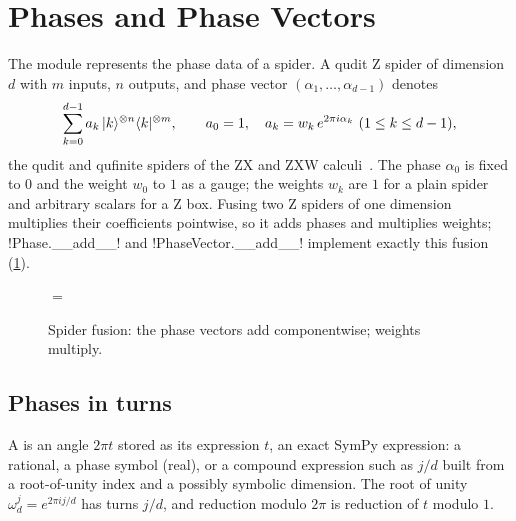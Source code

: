 \section{Phases and Phase Vectors}\label{sec:algebra-phase}

The module  represents the phase data of a spider. A qudit Z spider of dimension $d$ with $m$ inputs, $n$ outputs, and phase vector $(\alpha_1,\ldots,\alpha_{d-1})$ denotes
\begin{equation}\label{eq:algebra-zspider}
\sum_{k=0}^{d-1} a_k\,\lvert k \rangle^{\otimes n}\langle k \rvert^{\otimes m},\qquad a_0=1,\quad a_k=w_k\,e^{2\pi i\alpha_k}\ (1\le k\le d-1),
\end{equation}
the qudit and qufinite spiders of the ZX and ZXW calculi~\cite{coecke2011interacting,wang2021qufinite,wang2023qufinitezxw}. The phase $\alpha_0$ is fixed to $0$ and the weight $w_0$ to $1$ as a gauge; the weights $w_k$ are $1$ for a plain spider and arbitrary scalars for a Z box. Fusing two Z spiders of one dimension multiplies their coefficients pointwise, so it adds phases and multiplies weights; \py!Phase.__add__! and \py!PhaseVector.__add__! implement exactly this fusion (\cref{fig:algebra-fusion}).

\begin{figure}[H]
\centering
{}
\quad$=$\quad
{}
\caption{Spider fusion: the phase vectors add componentwise; weights multiply.}\label{fig:algebra-fusion}
\end{figure}

\subsection{Phases in turns}

\begin{definition}[Phase]\label{def:algebra-phase}
A  is an angle $2\pi t$ stored as its  expression $t$, an exact SymPy expression: a rational, a phase symbol (real), or a compound expression such as $j/d$ built from a root-of-unity index and a possibly symbolic dimension. The root of unity $\omega_d^j=e^{2\pi i j/d}$ has turns $j/d$, and reduction modulo $2\pi$ is reduction of $t$ modulo $1$.
\end{definition}

